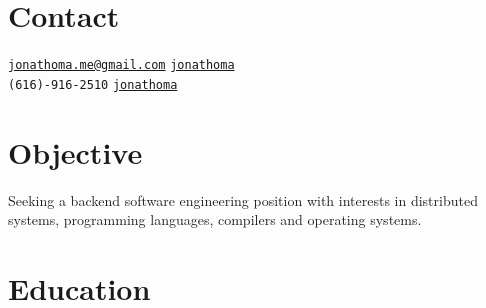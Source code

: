 \documentclass[margin,line]{resume}
\begin{document}
\begin{resume}
	\vspace{-3.5mm}
	\section{\mysidestyle Contact}
	\noindent 
		\faEnvelope \hspace{1mm} \href{mailto:jonathoma.me@gmail.com}{\nolinkurl{jonathoma.me@gmail.com}} \hfill%
		\faLinkedinSign \hspace{1mm} \href{https://linkedin.com/in/jonathoma}{\nolinkurl{jonathoma}}\\
	\noindent
		\faPhone \hspace{1mm} \nolinkurl{(616)-916-2510} \hfill 
		\faGithub \href{https://github.com/jonathoma}{\nolinkurl{jonathoma}} \\
	\vspace{-2.5mm}
	    
	\sectionbreak
	\section{\mysidestyle Objective}
	Seeking a backend software engineering position with interests in distributed systems, programming languages, compilers and operating systems. \\
	\vspace{-1.5mm}
	
	\sectionbreak
	\section{\mysidestyle Education}
	

\end{resume}
\end{document}
